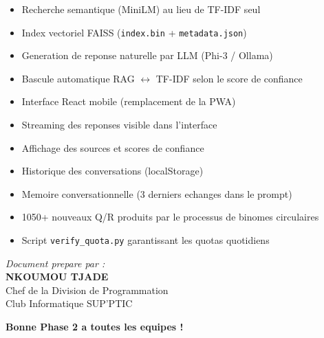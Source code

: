 \documentclass[11pt,a4paper]{article}
\renewcommand{\checkmark}{\ding{52}}
\begin{document}
\begin{phase2box}
\begin{itemize}
    \item[\checkmark] Recherche semantique (MiniLM) au lieu de TF-IDF seul
    \item[\checkmark] Index vectoriel FAISS (\texttt{index.bin} + \texttt{metadata.json})
    \item[\checkmark] Generation de reponse naturelle par LLM (Phi-3 / Ollama)
    \item[\checkmark] Bascule automatique RAG $\leftrightarrow$ TF-IDF selon le score de confiance
    \item[\checkmark] Interface React mobile (remplacement de la PWA)
    \item[\checkmark] Streaming des reponses visible dans l'interface
    \item[\checkmark] Affichage des sources et scores de confiance
    \item[\checkmark] Historique des conversations (localStorage)
    \item[\checkmark] Memoire conversationnelle (3 derniers echanges dans le prompt)
    \item[\checkmark] 1050+ nouveaux Q/R produits par le processus de binomes circulaires
    \item[\checkmark] Script \texttt{verify\_quota.py} garantissant les quotas quotidiens
\end{itemize}
\end{phase2box}

\vfill
\begin{center}
\textit{Document prepare par :} \\
\textbf{NKOUMOU TJADE} \\
Chef de la Division de Programmation \\
Club Informatique SUP'PTIC

\vspace{0.5cm}
\textbf{Bonne Phase 2 a toutes les equipes !}
\end{center}
\end{document}
